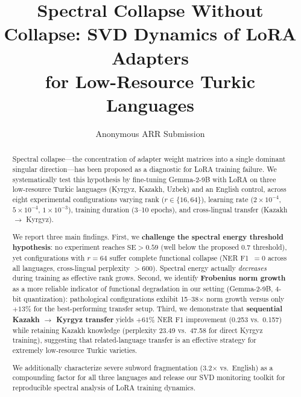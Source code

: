 \documentclass[11pt]{article}
\title{Spectral Collapse Without Collapse: SVD Dynamics of LoRA Adapters\\for Low-Resource Turkic Languages}
\author{Anonymous ARR Submission}
\begin{document}
\maketitle

\begin{abstract}
Spectral collapse---the concentration of adapter weight matrices into a single dominant singular direction---has been proposed as a diagnostic for LoRA training failure. We systematically test this hypothesis by fine-tuning Gemma-2-9B with LoRA on three low-resource Turkic languages (Kyrgyz, Kazakh, Uzbek) and an English control, across eight experimental configurations varying rank ($r \in \{16, 64\}$), learning rate ($2 \times 10^{-4}$, $5 \times 10^{-4}$, $1 \times 10^{-3}$), training duration (3--10 epochs), and cross-lingual transfer (Kazakh $\rightarrow$ Kyrgyz).

We report three main findings. First, we \textbf{challenge the spectral energy threshold hypothesis}: no experiment reaches $\text{SE} > 0.59$ (well below the proposed 0.7 threshold), yet configurations with $r=64$ suffer complete functional collapse (NER F1~$= 0$ across all languages, cross-lingual perplexity $> 600$). Spectral energy actually \emph{decreases} during training as effective rank grows. Second, we identify \textbf{Frobenius norm growth} as a more reliable indicator of functional degradation in our setting (Gemma-2-9B, 4-bit quantization): pathological configurations exhibit 15--38$\times$ norm growth versus only $+13\%$ for the best-performing transfer setup. Third, we demonstrate that \textbf{sequential Kazakh $\rightarrow$ Kyrgyz transfer} yields $+61\%$ NER F1 improvement (0.253 vs.\ 0.157) while retaining Kazakh knowledge (perplexity 23.49 vs.\ 47.58 for direct Kyrgyz training), suggesting that related-language transfer is an effective strategy for extremely low-resource Turkic varieties.

We additionally characterize severe subword fragmentation (3.2$\times$ vs.\ English) as a compounding factor for all three languages and release our SVD monitoring toolkit for reproducible spectral analysis of LoRA training dynamics.
\end{abstract}

\end{document}
